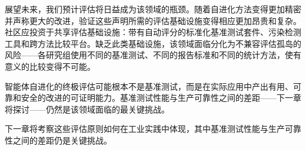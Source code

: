 展望未来，我们预计评估将日益成为该领域的瓶颈。随着自进化方法变得更加精密并声称更大的改进，验证这些声明所需的评估基础设施变得相应更加昂贵和复杂。社区应投资于共享评估基础设施：带有自动评分的标准化基准测试套件、污染检测工具和跨方法比较平台。缺乏此类基础设施，该领域面临分化为不兼容评估孤岛的风险——各研究组使用不同的基准测试、不同的报告标准和不同的统计方法，使有意义的比较变得不可能。

智能体自进化的终极评估可能根本不是基准测试，而是在实际应用中产出有用、可靠和安全的改进的可证明能力。基准测试性能与生产可靠性之间的差距——下一章将探讨——仍然是该领域面临的最关键挑战。

下一章将考察这些评估原则如何在工业实践中体现，其中基准测试性能与生产可靠性之间的差距仍是关键挑战。
